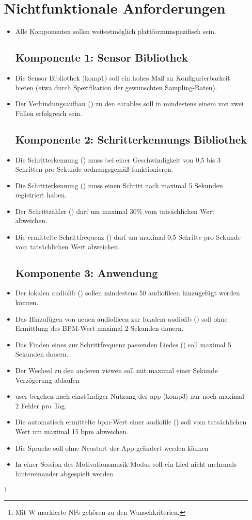 \documentclass[../pflichtenheft.tex]{subfiles}
\newcommand{\nf}[1]{\item[\hypertarget{nf#1}{/NF#1/}]}
\begin{document}
\section{Nichtfunktionale Anforderungen}
	\begin{itemize}
		\nf{010} Alle Komponenten sollen weitestmöglich plattformunspezifisch sein.
		\subsection{Komponente 1: Sensor Bibliothek}
			\nf{100} Die Sensor Bibliothek (\Gls{komp1}) soll ein hohes Maß an Konfigurierbarkeit bieten
			(etwa durch Spezifikation der gewünschten Sampling-Raten).
			\nf{110} Der Verbindungsaufbau () zu den \Gls{earable}s soll in mindestens einem von zwei
			Fällen erfolgreich sein.
		\subsection{Komponente 2: Schritterkennungs Bibliothek}
			\nf{200} Die Schritterkennung () muss bei einer Geschwindigkeit von 0,5 bis 3 Schritten pro
			Sekunde ordnungsgemäß funktionieren.
			\nf{210} Die Schritterkennung () muss einen Schritt nach maximal 5 Sekunden registriert haben.
			\nf{220} Der Schrittzähler () darf um maximal 30\% vom tatsächlichen Wert abweichen.
			\nf{230} Die ermittelte Schrittfrequenz () darf um maximal 0,5 Schritte pro Sekunde vom
			tatsächlichen Wert abweichen.
		\subsection{Komponente 3: Anwendung}
			\nf{300} Der lokalen \Gls{audiolib} () sollen mindestens 50 \Gls{audiofile}en hinzugefügt
			werden können.
			\nf{310} Das Hinzufügen von neuen \Gls{audiofile}en zur lokalem \Gls{audiolib} () soll ohne
			Ermittlung des BPM-Wert maximal 2 Sekunden dauern.
			\nf{320} Das Finden eines zur Schrittfrequenz passenden Liedes () soll maximal 5 Sekunden
			dauern.
			\nf{330} Der Wechsel zu den anderen \Gls{view}en soll mit maximal einer Sekunde Verzögerung ablaufen
			\nf{340} \Gls{user} begehen nach einstündiger Nutzung der \Gls{app} (\Gls{komp3}) nur noch maximal 2
			Fehler pro Tag.
			\nf{350W} Die automatisch ermittelte \Gls{bpm}-Wert einer \Gls{audiofile} () soll vom
			tatsächlichen Wert um maximal 15 \Gls{bpm} abweichen.
			\nf{360} Die Sprache soll ohne Neustart der App geändert werden können
			\nf{370} In einer Session des Motivationsmusik-Modus soll ein Lied nicht mehrmals hintereinander abgespielt werden
	\end{itemize}

	\let\thefootnote\relax\footnote{Mit W markierte NFs gehören zu den Wunschkriterien.}
\end{document}
